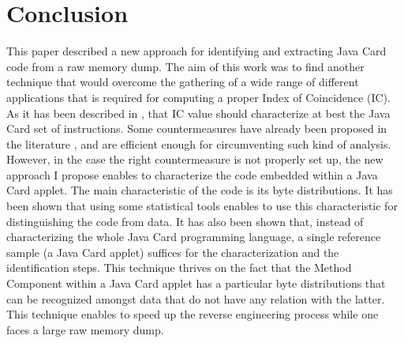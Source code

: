 \section{Conclusion}
This paper described a new approach for identifying and extracting Java Card code from a raw memory
dump. The aim of this work was to find another technique that would overcome the gathering of a wide range of
different applications that is required for computing a proper Index of
Coincidence (IC). As it has been described in \cite{conf/cardis/LanetBLCMMF14}, that IC value should characterize at best the Java Card set of instructions.
Some countermeasures have already been proposed in the literature
\cite{barbuthesis}, \cite{dynamicsyntax} and are efficient enough for
circumventing such kind of analysis. However, in the case the right
countermeasure is not properly set up, the new approach I propose enables to
characterize the code embedded within a Java Card applet. The main characteristic of the code is its byte distributions. It has been shown that using some statistical tools enables to use this characteristic
for distinguishing the code from data. It has also been shown that,
instead of characterizing the whole Java Card programming language, a single
reference sample (a Java Card applet) suffices for the characterization and the
identification steps. This technique thrives on the fact that the Method
Component within a Java Card applet has a particular byte distributions that
can be recognized amongst data that do not have any relation with the latter. This technique enables to speed up the reverse engineering process while one faces a large raw memory dump.








